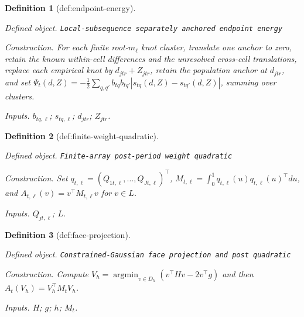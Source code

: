 \documentclass{article}
\newtheorem{definition}{Definition}
\begin{document}
\begin{definition}[def:endpoint-energy]\label{def:endpoint-energy}
\par\smallskip\noindent\emph{Defined object.} \texttt{Local-\allowbreak{}subsequence separately anchored endpoint energy}
\par\smallskip\noindent\emph{Construction.} For each finite root-\(m_\ell\) knot cluster, translate one anchor to zero, retain the known within-cell differences and the unresolved cross-cell translations, replace each empirical knot by \(d_{jtr}+Z_{jtr}\), retain the population anchor at \(d_{jtr}\), and set \(\Psi_t(d,Z)=-\tfrac12\sum_{q,q'}b_{tq}b_{tq'}|s_{tq}(d,Z)-s_{tq'}(d,Z)|\), summing over clusters.
\par\smallskip\noindent\emph{Inputs.} \(b_{tq,\ell}\); \(s_{tq,\ell}\); \(d_{jtr}\); \(Z_{jtr}\).
\end{definition}

\begin{definition}[def:finite-weight-quadratic]\label{def:finite-weight-quadratic}
\par\smallskip\noindent\emph{Defined object.} \texttt{Finite-\allowbreak{}array post-\allowbreak{}period weight quadratic}
\par\smallskip\noindent\emph{Construction.} Set \(q_{t,\ell}=(Q_{1t,\ell},\ldots,Q_{Jt,\ell})^\top\), \(M_{t,\ell}=\int_0^1q_{t,\ell}(u)q_{t,\ell}(u)^\top du\), and \(A_{t,\ell}(v)=v^\top M_{t,\ell}v\) for \(v\in L\).
\par\smallskip\noindent\emph{Inputs.} \(Q_{jt,\ell}\); \(L\).
\end{definition}

\begin{definition}[def:face-projection]\label{def:face-projection}
\par\smallskip\noindent\emph{Defined object.} \texttt{Constrained-\allowbreak{}Gaussian face projection and post quadratic}
\par\smallskip\noindent\emph{Construction.} Compute \(V_h=\operatorname*{argmin}_{v\in D_h}(v^\top Hv-2v^\top g)\) and then \(A_t(V_h)=V_h^\top M_tV_h\).
\par\smallskip\noindent\emph{Inputs.} \(H\); \(g\); \(h\); \(M_t\).
\end{definition}
\end{document}
